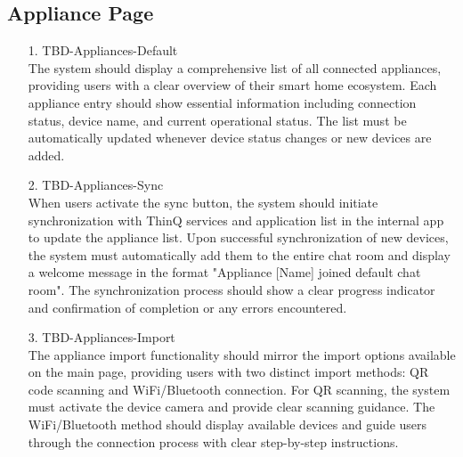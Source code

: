 \documentclass[conference]{IEEEtran}
\begin{document}
\begin{enumerate}
\begin{itemize}
\begin{itemize}
\subsection{Appliance Page}
    \begin{enumerate}
        \item[1.] TBD-Appliances-Default \\
        The system should display a comprehensive list of all connected appliances, providing users with a clear overview of their smart home ecosystem. Each appliance entry should show essential information including connection status, device name, and current operational status. The list must be automatically updated whenever device status changes or new devices are added. \\
    \end{enumerate}
    
    \begin{enumerate}
        \item[2.] TBD-Appliances-Sync \\
        When users activate the sync button, the system should initiate synchronization with ThinQ services and application list in the internal app to update the appliance list. Upon successful synchronization of new devices, the system must automatically add them to the entire chat room and display a welcome message in the format "Appliance [Name] joined default chat room". The synchronization process should show a clear progress indicator and confirmation of completion or any errors encountered. \\
    \end{enumerate}
    
    \begin{enumerate}
        \item[3.] TBD-Appliances-Import \\
        The appliance import functionality should mirror the import options available on the main page, providing users with two distinct import methods: QR code scanning and WiFi/Bluetooth connection. For QR scanning, the system must activate the device camera and provide clear scanning guidance. The WiFi/Bluetooth method should display available devices and guide users through the connection process with clear step-by-step instructions.  \\
    \end{enumerate}
    

\end{itemize}
\end{itemize}
\end{enumerate}
\end{document}
